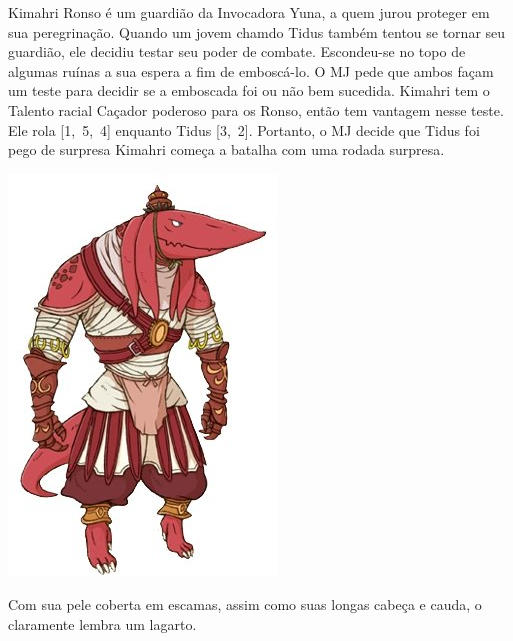 %
\vfill
%
{
	Kimahri Ronso é um guardião da Invocadora Yuna, a quem jurou proteger em sua peregrinação.
	Quando um jovem chamdo Tidus também tentou se tornar seu guardião, ele decidiu testar seu poder de combate.
	Escondeu-se no topo de algumas ruínas a sua espera a fim de emboscá-lo.
	O MJ pede que ambos façam um teste para decidir se a emboscada foi ou não bem sucedida.
	Kimahri tem o Talento racial Caçador poderoso para os Ronso, então tem vantagem nesse teste.
	Ele rola [1,~5,~4] enquanto Tidus [3,~2].
	Portanto, o MJ decide que Tidus foi pego de surpresa  Kimahri começa a batalha com uma rodada surpresa.
}
%
\clearpage
%
%
%
\begin{center} \includegraphics[width=0.88\columnwidth]{./art/races/bangaa.jpg} \end{center}
%
Com sua pele coberta em escamas, assim como suas longas cabeça e cauda, o  claramente lembra um lagarto.

